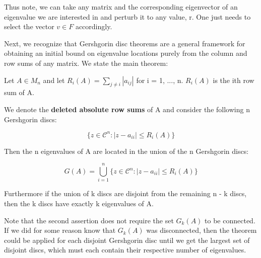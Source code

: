 \documentclass[class=article, crop=false]{standalone}
\begin{document}
	Thus note, we can take any matrix and the corresponding eigenvector of an eigenvalue we are interested in and perturb it to any value, r. One just needs to select the vector $v \in F$ accordingly.

	Next, we recognize that Gershgorin disc theorems are a general framework for obtaining an initial bound on eigenvalue locations purely from the column and row sums of any matrix. We state the main theorem:

	\begin{theorem}
	\label{thm:gershgorin_disc_thm}
		Let $A \in M_n$ and let $R_i(A) = \sum_{j \neq i} |a_{ij}|$ for i = 1, ..., n. $R_i(A)$ is the ith row sum of A. 

		We denote the \textbf{deleted absolute row sums} of A and consider the following n Gershgorin discs:

			$$\{z \in \mathcal{C}^n : |z - a_{ii}| \le R_i(A) \}$$

		Then the n eigenvalues of A are located in the union of the n Gershgorin discs:

			$$G(A) = \bigcup_{i=1}^n \{z \in \mathcal{C}^n : |z - a_{ii}| \le R_i(A) \}$$

		Furthermore if the union of k discs are disjoint from the remaining n - k discs, then the k discs have exactly k eigenvalues of A.
	\end{theorem}

	Note that the second assertion does not require the set $G_k(A)$ to be connected. If we did for some reason know that $G_k(A)$ was disconnected, then the theorem could be applied for each disjoint Gershgorin disc until we get the largest set of disjoint discs, which must each contain their respective number of eigenvalues.
\end{document}
